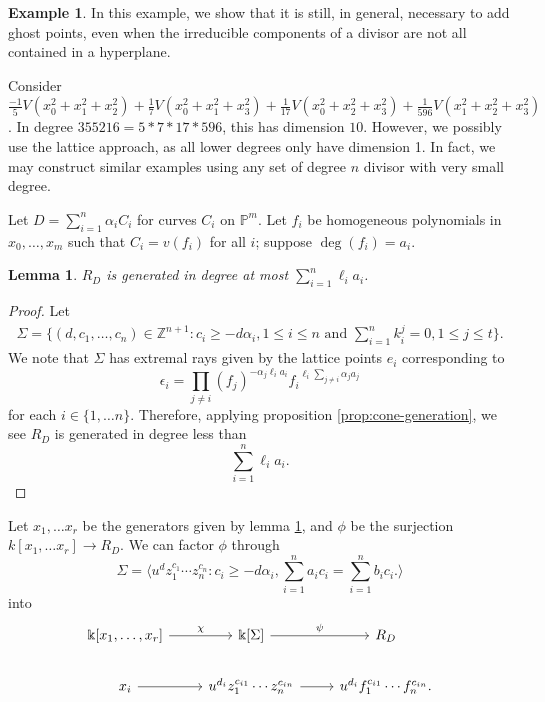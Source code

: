 \documentclass{amsart}
\theoremstyle{plain}
\newtheorem{lem}[thm]{Lemma}
\theoremstyle{definition}
\newtheorem{example}[thm]{Example}
\theoremstyle{remark}
\numberwithin{equation}{section}
\newcommand\bz{{\mathbb Z}}
\newcommand\bk{{\Bbbk}}
\newcommand\bida{a}
\newcommand\bidb{b}
\begin{document}
\begin{example}
\label{eg:radical}
In this example, we show that it is still, in general, necessary to add ghost points, even when the irreducible components of a divisor are not all contained in a hyperplane.

Consider $\frac{-1}{5}V(x_0^2 + x_1^2 + x_2^2) + \frac{1}{7}V(x_0^2 + x_1^2 + x_3^2) + \frac{1}{17}V(x_0^2 + x_2^2 + x_3^2) + \frac{1}{596}V(x_1^2 + x_2^2 + x_3^2)$. In degree $355216 = 5* 7 * 17 * 596$, this has dimension $10$. 
However, we possibly use the lattice approach, as all lower degrees only have dimension 1. In fact, we may construct similar examples using any set of degree $n$ divisor with very small degree.
\end{example}

Let $D = \sum_{i=1}^n \alpha_i C_i$ for curves $C_i$ on $\mathbb{P}^m$.  Let $f_i$ be homogeneous polynomials in $x_0, \ldots, x_m$ such that $C_i = v(f_i)$ for all $i$; suppose $\deg(f_i) = a_i$. 
\begin{lem} \label{P-m-generators}
$R_D$ is generated in degree at most $\sum_{i=1}^n \ell_i a_i$.
\end{lem}
\begin{proof}
Let 
\begin{align}\label{eqn:Sigma-def}
	\Sigma = \{(d, c_1, \ldots, c_n) \in \bz^{n+1} : c_i \geq - d \alpha_i,1 \leq i \leq n \text{ and } \sum_{i=1}^{n}k_i^j = 0, 1 \leq j \leq t\}.
\end{align}
We note that $\Sigma$ has extremal rays given by the lattice points $e_i$ corresponding to
\begin{equation}\label{eqn:epilon-def-P-m}
	\epsilon_i = \prod_{j\ne i} (f_j)^{-\alpha_j \ell_i a_i} {f_i}^{\ell_i \sum_{j\ne i} \alpha_j a_j}
\end{equation}
for each $i\in \{1, \ldots n\}$.  Therefore, applying proposition \ref{prop:cone-generation}, we see $R_D$ is generated in degree less than
\[
	\sum_{i=1}^n \ell_i a_i.
\]
\end{proof}

Let $x_1, \ldots x_r$ be the generators given by lemma  \ref{P-m-generators}, and $\phi$ be the surjection $k[x_1, \ldots x_r] \to R_D$.  We can factor $\phi$ through 
\[
	\Sigma =  \langle u^d z_1^{c_1} \cdots z_n^{c_n} : c_i \geq -d \alpha_i, \sum_{i=1}^{n} \bida_i c_i = \sum_{i=1}^{n} \bidb_i c_i. \rangle 
\]
into
\[
\begin{tikzcd}
\bk[x_1,\ldots, x_r] \ar {r}{\chi} & \bk[\Sigma] \ar {r}{\psi} & R_D \\
x_i \ar r & u^{d_i}z_1^{c_{i1}} \cdots z_n^{c_{in}} \ar r & u^{d_i}f_1^{c_{i1}} \cdots f_n^{c_{in}}.
\end{tikzcd}
\]
\end{document}
